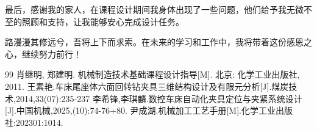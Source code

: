 \documentclass[withoutpreface,bwprint]{cumcmthesis}
\begin{document}
最后，感谢我的家人，在课程设计期间我身体出现了一些问题，他们给予我无微不至的照顾和支持，让我能够安心完成设计任务。

路漫漫其修远兮，吾将上下而求索。在未来的学习和工作中，我将带着这份感恩之心，继续努力前行！

\begin{thebibliography}{99}
     肖继明, 郑建明. 机械制造技术基础课程设计指导[M]. 北京: 化学工业出版社, 2011.
     王素艳.车床尾座体六面回转钻夹具三维结构设计及有限元分析[J].煤炭技术,2014,33(07):235-237
     李希锋,李琪麟.数控车床自动化夹具定位与夹紧系统设计[J].中国机械,2025,(10):74-76+80.
     尹成湖.机械加工工艺手册[M].化学工业出版社:202301:1014.
\end{thebibliography}

\newpage
\end{document}
